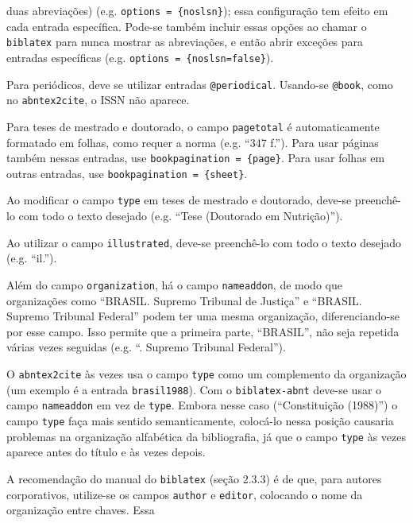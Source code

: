 \documentclass[a4paper]{article}
\begin{document}
\begin{itemize}
\begin{sloppypar}
      duas abreviações) (e.g. \texttt{options = \{noslsn\}}); essa
      configuração tem efeito em cada entrada específica. Pode-se também
      incluir essas opções ao chamar o \texttt{biblatex} para nunca mostrar as
      abreviações, e então abrir exceções para entradas específicas (e.g.
      \texttt{options = \{noslsn=false\}}).
    \item Para periódicos, deve se utilizar entradas \texttt{@periodical}.
      Usando-se \texttt{@book}, como no \texttt{abntex2cite}, o ISSN não
      aparece.
    \item Para teses de mestrado e doutorado, o campo \texttt{pagetotal}
      é automaticamente formatado em folhas, como requer a norma (e.g. ``347
      f.''). Para usar páginas também nessas entradas, use
      \texttt{bookpagination = \{page\}}. Para usar folhas em outras entradas,
      use \texttt{bookpagination = \{sheet\}}.
    \item Ao modificar o campo \texttt{type} em teses de mestrado e doutorado,
      deve-se preenchê-lo com todo o texto desejado (e.g. ``Tese (Doutorado em
      Nutrição)'').
    \item Ao utilizar o campo \texttt{illustrated}, deve-se preenchê-lo com
      todo o texto desejado (e.g. ``il.'').
    \item Além do campo \texttt{organization}, há o campo \texttt{nameaddon},
      de modo que organizações como ``BRASIL. Supremo Tribunal de Justiça''
      e ``BRASIL. Supremo Tribunal Federal'' podem ter uma mesma organização,
      diferenciando-se por esse campo. Isso permite que a primeira parte,
      ``BRASIL'', não seja repetida várias vezes seguidas (e.g.
      ``\underline{\hspace*{4em}}. Supremo Tribunal Federal'').
    \item O \texttt{abntex2cite} às vezes usa o campo \texttt{type} como um
      complemento da organização (um exemplo é a entrada \texttt{brasil1988}).
      Com o \texttt{biblatex-abnt} deve-se usar o campo \texttt{nameaddon} em
      vez de \texttt{type}. Embora nesse caso (``Constituição (1988)'')
      o campo \texttt{type} faça mais sentido semanticamente, colocá-lo nessa
      posição causaria problemas na organização alfabética da bibliografia, já
      que o campo \texttt{type} às vezes aparece antes do título e às vezes
      depois.
    \item A recomendação do manual do \texttt{biblatex} (seção 2.3.3) é de
      que, para autores corporativos, utilize-se os campos \texttt{author}
      e \texttt{editor}, colocando o nome da organização entre chaves. Essa

\end{sloppypar}
\end{itemize}
\end{document}

